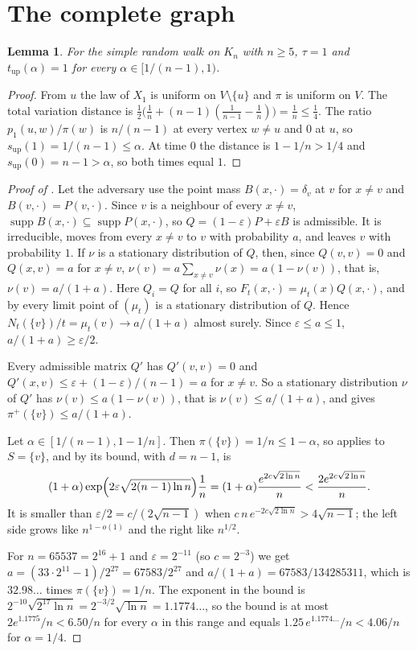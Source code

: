 \documentclass[11pt]{article}
\newtheorem{lemma}[theorem]{Lemma}
\theoremstyle{remark}
\theoremstyle{plain}
\DeclareMathOperator{\supp}{supp}
\newcommand{\tup}{t_{\mathrm{up}}}
\begin{document}
\section{The complete graph}\label{sec:fail}

\begin{lemma}\label{lem:kn}
For the simple random walk on $K_n$ with $n\ge5$, $\tau=1$ and $\tup(\alpha)=1$ for every $\alpha\in[1/(n-1),1)$.
\end{lemma}

\begin{proof}
From $u$ the law of $X_1$ is uniform on $V\setminus\{u\}$ and $\pi$ is uniform on $V$. The total variation distance
is $\frac12\bigl(\frac1n+(n-1)(\frac1{n-1}-\frac1n)\bigr)=\frac1n\le\frac14$. The ratio $p_1(u,w)/\pi(w)$ is $n/(n-1)$
at every vertex $w\ne u$ and $0$ at $u$, so $s_{\mathrm{up}}(1)=1/(n-1)\le\alpha$. At time $0$ the distance is
$1-1/n>1/4$ and $s_{\mathrm{up}}(0)=n-1>\alpha$, so both times equal $1$.
\end{proof}

\begin{proof}[Proof of ]
Let the adversary use the point mass $B(x,\cdot)=\delta_v$ at $v$ for $x\ne v$ and $B(v,\cdot)=P(v,\cdot)$. Since
$v$ is a neighbour of every $x\ne v$, $\supp B(x,\cdot)\subseteq\supp P(x,\cdot)$, so
$Q=(1-\varepsilon)P+\varepsilon B$ is admissible. It is irreducible, moves from every $x\ne v$ to $v$ with
probability $a$, and leaves $v$ with probability $1$. If $\nu$ is a stationary distribution of $Q$, then, since
$Q(v,v)=0$ and $Q(x,v)=a$ for $x\ne v$, $\nu(v)=a\sum_{x\ne v}\nu(x)=a(1-\nu(v))$, that is, $\nu(v)=a/(1+a)$. Here
$Q_i=Q$ for all $i$, so $F_t(x,\cdot)=\mu_t(x)Q(x,\cdot)$, and by  every limit point of $(\mu_t)$ is a
stationary distribution of $Q$. Hence $N_t(\{v\})/t=\mu_t(v)\to a/(1+a)$ almost surely. Since $\varepsilon\le a\le1$,
$a/(1+a)\ge\varepsilon/2$.

Every admissible matrix $Q'$ has $Q'(v,v)=0$ and $Q'(x,v)\le\varepsilon+(1-\varepsilon)/(n-1)=a$ for $x\ne v$. So a
stationary distribution $\nu$ of $Q'$ has $\nu(v)\le a(1-\nu(v))$, that is $\nu(v)\le a/(1+a)$, and
 gives $\pi^+(\{v\})\le a/(1+a)$.

Let $\alpha\in[1/(n-1),1-1/n]$. Then $\pi(\{v\})=1/n\le1-\alpha$, so  applies to $S=\{v\}$, and by
 its bound, with $d=n-1$, is
\[
(1+\alpha)\exp\Bigl(2\varepsilon\sqrt{2(n-1)\ln n}\Bigr)\frac1n=(1+\alpha)\frac{e^{2c\sqrt{2\ln n}}}{n}<\frac{2e^{2c\sqrt{2\ln n}}}{n}.
\]
It is smaller than $\varepsilon/2=c/(2\sqrt{n-1})$ when $c\,n\,e^{-2c\sqrt{2\ln n}}>4\sqrt{n-1}$; the left side grows
like $n^{1-o(1)}$ and the right like $n^{1/2}$.

For $n=65537=2^{16}+1$ and $\varepsilon=2^{-11}$ (so $c=2^{-3}$) we get $a=(33\cdot2^{11}-1)/2^{27}=67583/2^{27}$ and
$a/(1+a)=67583/134285311$, which is $32.98\dots$ times $\pi(\{v\})=1/n$. The exponent in the bound is
$2^{-10}\sqrt{2^{17}\ln n}=2^{-3/2}\sqrt{\ln n}=1.1774\dots$, so the bound is at most $2e^{1.1775}/n<6.50/n$ for
every $\alpha$ in this range and equals $1.25\,e^{1.1774\dots}/n<4.06/n$ for $\alpha=1/4$.
\end{proof}
\end{document}
